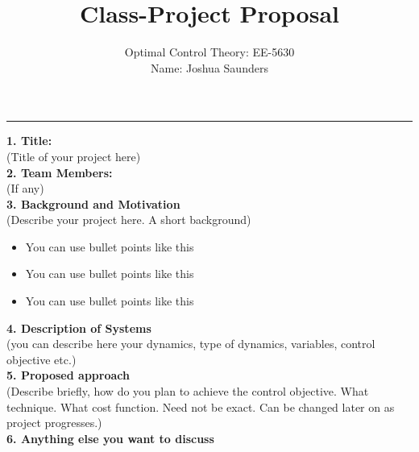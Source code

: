 \documentclass[12pt]{project_proposal}
\begin{document}


\title{Class-Project Proposal}

\author{Optimal Control Theory: EE-5630\\
Name: Joshua Saunders\\}

\maketitle

\hrule
\vspace{5mm}
\textbf{1. Title:}\\

(Title of your project here)\\

\textbf{2. Team Members:}\\

(If any)\\

\textbf{3. Background and Motivation}\\
(Describe your project here. A short background)
\begin{itemize}
\item You can use bullet points like this
\item You can use bullet points like this
\item You can use bullet points like this
\end{itemize}



\textbf{4. Description of Systems}\\
(you can describe here your dynamics, type of dynamics, variables, control objective etc.)\\


\textbf{5. Proposed approach}\\
(Describe briefly, how do you plan to achieve the control objective. What technique. What cost function. Need not be exact. Can be changed later on as project progresses.)\\

\textbf{6. Anything else you want to discuss}\\






\end{document}
